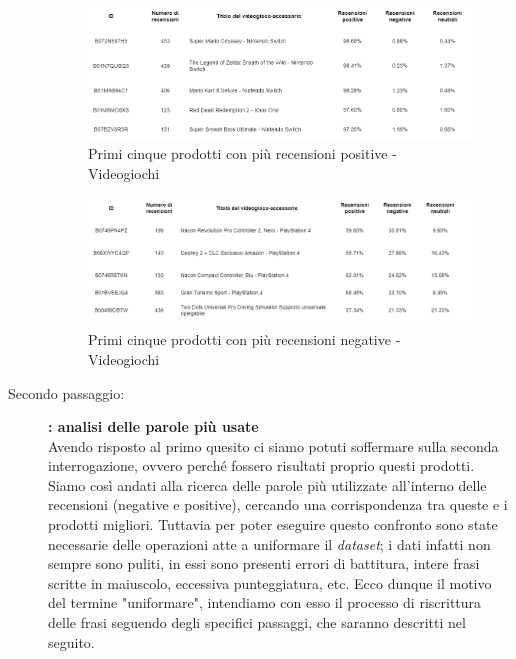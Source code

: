 \begin{description}
			\begin{figure} [h]
				\includegraphics[width=\textwidth]{Figure/top_pos_videogames_table}
				\caption{Primi cinque prodotti con più recensioni positive - Videogiochi}
				\label{fig:top_pos_videogames_table}
			\end{figure} 
			
			\begin{figure} [h]
				\includegraphics[width=\textwidth]{Figure/top_neg_videogames_table}
				\caption{Primi cinque prodotti con più recensioni negative - Videogiochi}
				\label{fig:top_neg_videogames_table}
			\end{figure}
		
		\item [Secondo passaggio:] \textbf{: analisi delle parole più usate}\\
			Avendo risposto al primo quesito ci siamo potuti soffermare sulla seconda interrogazione, ovvero perché fossero risultati proprio questi prodotti. Siamo così andati alla ricerca delle parole più utilizzate all'interno delle recensioni (negative e positive), cercando una corrispondenza tra queste e i prodotti migliori. Tuttavia per poter eseguire questo confronto sono state necessarie delle operazioni atte a uniformare il \textit{dataset}; i dati infatti non sempre sono puliti, in essi sono presenti errori di battitura, intere frasi scritte in maiuscolo, eccessiva punteggiatura, etc. Ecco dunque il motivo del termine "uniformare", intendiamo con esso il processo di riscrittura delle frasi seguendo degli specifici passaggi, che saranno descritti nel seguito.
		

\end{description}
